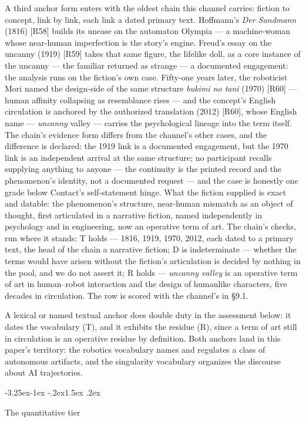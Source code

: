 \documentclass[11pt,a4paper]{article}
\makeatletter
\renewcommand\subsection{\@startsection{subsection}{2}{\z@}%
  {-3.25ex\@plus -1ex \@minus -.2ex}{1.5ex \@plus .2ex}%
  {\normalfont\large\bfseries\raggedright}}
\makeatother
\begin{document}
A third anchor form enters with the oldest chain this channel carries: fiction to concept, link by link, each link a dated primary text. Hoffmann's \textit{Der Sandmann} (1816) [R58] builds its unease on the automaton Olympia — a machine-woman whose near-human imperfection is the story's engine. Freud's essay on the uncanny (1919) [R59] takes that same figure, the lifelike doll, as a core instance of the uncanny — the familiar returned as strange — a documented engagement: the analysis runs on the fiction's own case. Fifty-one years later, the roboticist Mori named the design-side of the same structure \textit{bukimi no tani} (1970) [R60] — human affinity collapsing as resemblance rises — and the concept's English circulation is anchored by the authorized translation (2012) [R60], whose English name — \textit{uncanny} valley — carries the psychological lineage into the term itself. The chain's evidence form differs from the channel's other cases, and the difference is declared: the 1919 link is a documented engagement, but the 1970 link is an independent arrival at the same structure; no participant recalls supplying anything to anyone — the continuity is the printed record and the phenomenon's identity, not a documented request — and the case is honestly one grade below Contact's self-statement hinge. What the fiction supplied is exact and datable: the phenomenon's structure, near-human mismatch as an object of thought, first articulated in a narrative fiction, named independently in psychology and in engineering, now an operative term of art. The chain's checks, run where it stands: T holds — 1816, 1919, 1970, 2012, each dated to a primary text, the head of the chain a narrative fiction; D is indeterminate — whether the terms would have arisen without the fiction's articulation is decided by nothing in the pool, and we do not assert it; R holds — \textit{uncanny valley} is an operative term of art in human--robot interaction and the design of humanlike characters, five decades in circulation. The row is scored with the channel's in §9.1.

A lexical or named textual anchor does double duty in the assessment below: it dates the vocabulary (T), and it exhibits the residue (R), since a term of art still in circulation is an operative residue by definition. Both anchors land in this paper's territory: the robotics vocabulary names and regulates a class of autonomous artifacts, and the singularity vocabulary organizes the discourse about AI trajectories.

\subsection{The quantitative tier}
\end{document}
